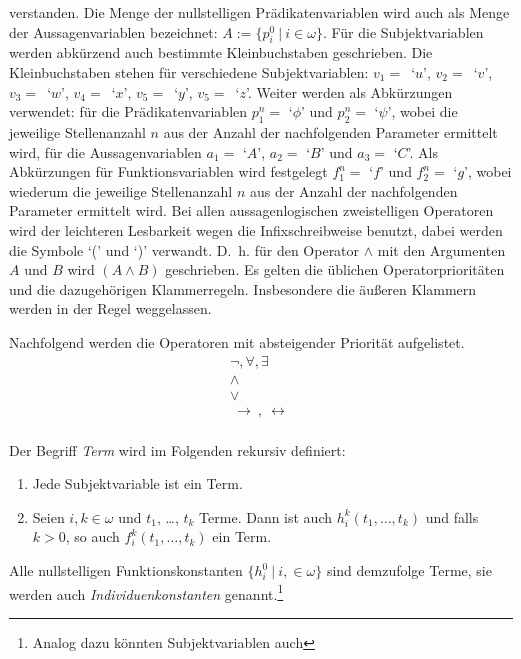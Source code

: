 \documentclass[a4paper,german,10pt,twoside]{book}
\newcommand{\impl}{\ \rightarrow \ }
\newcommand{\equi}{\ \leftrightarrow \ }
\begin{document}
{verstanden. Die Menge der nullstelligen Pr{\"a}dikatenvariablen wird auch als Menge der
Aussagenvariablen bezeichnet: $A := \{p_i^0~|~i
\in \omega \}$. F{\"u}r die Subjektvariablen werden abk{\"u}rzend auch bestimmte Kleinbuchstaben
geschrieben. Die Kleinbuchstaben stehen f{\"u}r verschiedene Subjektvariablen: \mbox{$v_1 = $ `$u$'},
\mbox{$v_2 = $ `$v$'}, \mbox{$v_3 = $ `$w$'}, \mbox{$v_4 = $ `$x$'}, \mbox{$v_5 = $ `$y$'},
\mbox{$v_5 = $ `$z$'}. Weiter werden als Abk{\"u}rzungen verwendet: f{\"u}r die Pr{\"a}dikatenvariablen $p^n_1
= $ `$\phi$' und $p^n_2 = $ `$\psi$', wobei die jeweilige Stellenanzahl $n$ aus der Anzahl der
nachfolgenden Parameter ermittelt wird, f{\"u}r die Aussagenvariablen $a_1 = $ `$A$', $a_2 = $ `$B$'
und $a_3 = $ `$C$'. Als Abk{\"u}rzungen f{\"u}r Funktionsvariablen wird festgelegt $f^n_1 = $ `$f$' und
$f^n_2 = $ `$g$', wobei wiederum die jeweilige Stellenanzahl $n$ aus der Anzahl der nachfolgenden
Parameter ermittelt wird. Bei allen aussagenlogischen zweistelligen Operatoren wird der leichteren
Lesbarkeit wegen die Infixschreibweise benutzt, dabei werden die Symbole `(' und `)' verwandt.
D.~h. f{\"u}r den Operator $\land$ mit den Argumenten $A$ und $B$ wird $(A \land B)$ geschrieben. Es
gelten die {\"u}blichen Operatorpriorit{\"a}ten und die dazugeh{\"o}rigen Klammerregeln. Insbesondere die
{\"a}u{\ss}eren Klammern werden in der Regel weggelassen.
\par
Nachfolgend werden die Operatoren mit absteigender Priorit{\"a}t aufgelistet.
$$
\begin{array}{c}
  \neg, \forall, \exists  \\
  \land \\
  \lor \\
  \impl, \equi \\
\end{array}
$$
\par
Der Begriff \emph{Term} wird im Folgenden rekursiv definiert:
\begin{enumerate}
\item Jede Subjektvariable ist ein Term. \item Seien $i, k \in \omega$ und $t_1$, \ldots, $t_k$
Terme. Dann ist auch $h^k_i(t_1, \ldots, t_k)$ und falls $k > 0$, so auch $f^k_i(t_1, \ldots, t_k)$
ein Term.
\end{enumerate}
Alle nullstelligen Funktionskonstanten $\{h^0_i~|~i, \in \omega\}$ sind demzufolge Terme, sie
werden auch \emph{Individuenkonstanten} genannt.\footnote{Analog dazu k{\"o}nnten Subjektvariablen auch
}}
\end{document}

